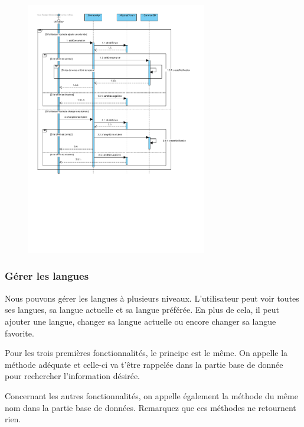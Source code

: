 \begin{figure}[h]
\centering
\includegraphics[width = 0.7\textwidth]{Base/sequence/img/common/gerer_les_donne.pdf}
\end{figure}

\newpage
\subsubsection{Gérer les langues}

\begin{flushleft}
Nous pouvons gérer les langues à plusieurs niveaux. L'utilisateur peut voir toutes ses langues, sa langue actuelle et sa langue préférée. En plus de cela, il peut ajouter une langue, changer sa langue actuelle ou encore changer sa langue favorite.
\end{flushleft}

\begin{flushleft}
Pour les trois premières fonctionnalités, le principe est le même. On appelle la méthode adéquate et celle-ci va t'être rappelée dans la partie base de donnée pour rechercher l'information désirée.
\end{flushleft}

\begin{flushleft}
Concernant les autres fonctionnalités, on appelle également la méthode du même nom dans la partie base de données. Remarquez que ces méthodes ne retournent rien.
\end{flushleft}

